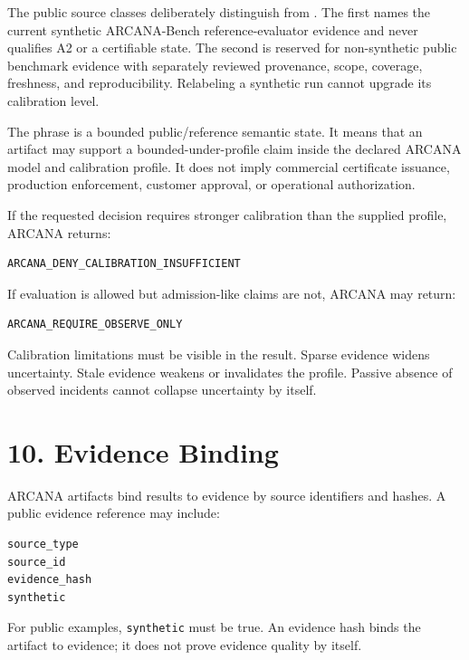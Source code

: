 \documentclass[
  american,
  a4paper,
  10pt]{article}
\begin{document}
The public source classes deliberately distinguish  from
. The first names the current synthetic
ARCANA-Bench reference-evaluator evidence and never qualifies A2 or a certifiable state.
The second is reserved for non-synthetic public benchmark evidence with separately
reviewed provenance, scope, coverage, freshness, and reproducibility. Relabeling a
synthetic run cannot upgrade its calibration level.

The phrase  is a bounded public/reference semantic
state. It means that an artifact may support a bounded-under-profile claim inside the
declared ARCANA model and calibration profile. It does not imply commercial certificate
issuance, production enforcement, customer approval, or operational authorization.

If the requested decision requires stronger calibration than the supplied profile,
ARCANA returns:

\begin{Verbatim}[breaklines=true,breakanywhere=true,fontsize=\small]
ARCANA_DENY_CALIBRATION_INSUFFICIENT
\end{Verbatim}

If evaluation is allowed but admission-like claims are not, ARCANA may return:

\begin{Verbatim}[breaklines=true,breakanywhere=true,fontsize=\small]
ARCANA_REQUIRE_OBSERVE_ONLY
\end{Verbatim}

Calibration limitations must be visible in the result. Sparse evidence widens
uncertainty. Stale evidence weakens or invalidates the profile. Passive absence of
observed incidents cannot collapse uncertainty by itself.

\section{10. Evidence Binding}\label{10-evidence-binding}

ARCANA artifacts bind results to evidence by source identifiers and hashes. A public
evidence reference may include:

\begin{Verbatim}[breaklines=true,breakanywhere=true,fontsize=\small]
source_type
source_id
evidence_hash
synthetic
\end{Verbatim}

For public examples, \texttt{synthetic} must be true. An evidence hash binds the
artifact to evidence; it does not prove evidence quality by itself.
\end{document}
